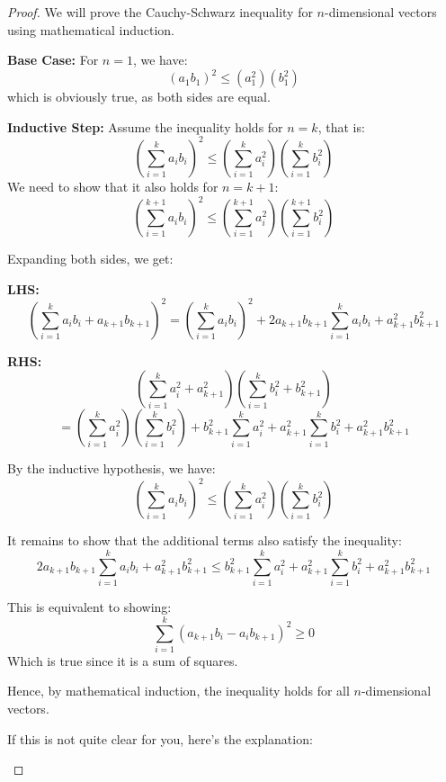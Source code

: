 \begin{proof}
    We will prove the Cauchy-Schwarz inequality for \( n \)-dimensional vectors using mathematical induction.

\textbf{Base Case:} For \( n = 1 \), we have:
\[
(a_1b_1)^2 \leq (a_1^2)(b_1^2)
\]
which is obviously true, as both sides are equal.

\textbf{Inductive Step:}
Assume the inequality holds for \( n = k \), that is:
\[
\left(\sum_{i=1}^{k} a_ib_i\right)^2 \leq \left(\sum_{i=1}^{k} a_i^2\right)\left(\sum_{i=1}^{k} b_i^2\right)
\]
We need to show that it also holds for \( n = k+1 \):
\[
\left(\sum_{i=1}^{k+1} a_ib_i\right)^2 \leq \left(\sum_{i=1}^{k+1} a_i^2\right)\left(\sum_{i=1}^{k+1} b_i^2\right)
\]

Expanding both sides, we get:

\textbf{LHS:}
\[
\left(\sum_{i=1}^{k} a_ib_i + a_{k+1}b_{k+1}\right)^2 = \left(\sum_{i=1}^{k} a_ib_i\right)^2 + 2a_{k+1}b_{k+1}\sum_{i=1}^{k} a_ib_i + a_{k+1}^2b_{k+1}^2
\]

\textbf{RHS:}
\[
\left(\sum_{i=1}^{k} a_i^2 + a_{k+1}^2\right)\left(\sum_{i=1}^{k} b_i^2 + b_{k+1}^2\right)
\]
\[
= \left(\sum_{i=1}^{k} a_i^2\right)\left(\sum_{i=1}^{k} b_i^2\right) + b_{k+1}^2\sum_{i=1}^{k} a_i^2 + a_{k+1}^2\sum_{i=1}^{k} b_i^2 + a_{k+1}^2b_{k+1}^2
\]

By the inductive hypothesis, we have:
\[
\left(\sum_{i=1}^{k} a_ib_i\right)^2 \leq \left(\sum_{i=1}^{k} a_i^2\right)\left(\sum_{i=1}^{k} b_i^2\right)
\]

It remains to show that the additional terms also satisfy the inequality:
\[
2a_{k+1}b_{k+1}\sum_{i=1}^{k} a_ib_i + a_{k+1}^2b_{k+1}^2 \leq b_{k+1}^2\sum_{i=1}^{k} a_i^2 + a_{k+1}^2\sum_{i=1}^{k} b_i^2 + a_{k+1}^2b_{k+1}^2
\]

This is equivalent to showing:
\[
\sum_{i=1}^{k} (a_{k+1}b_i - a_ib_{k+1})^2 \geq 0
\]
Which is true since it is a sum of squares.

\noindent Hence, by mathematical induction, the inequality holds for all \( n \)-dimensional vectors.
\begin{remark}
    If this is not quite clear for you, here's the explanation: 


\end{remark}
\end{proof}
